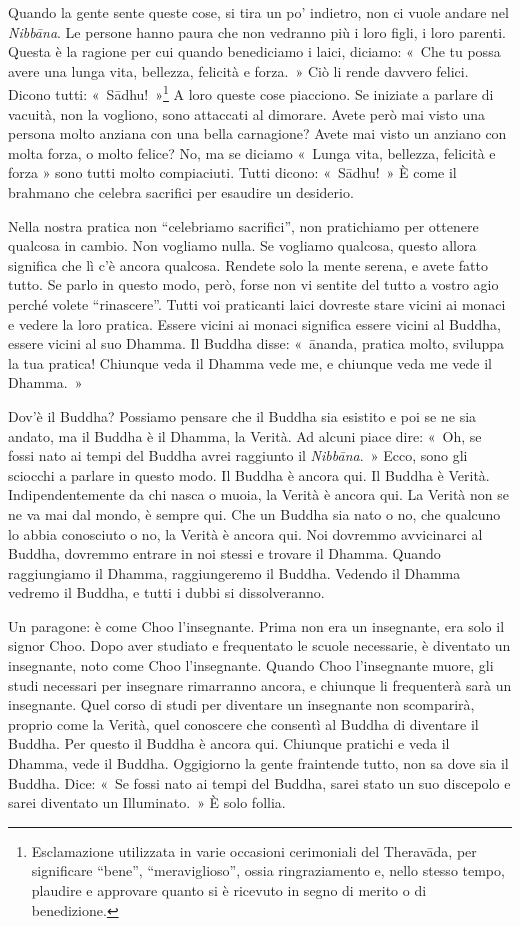 Quando la gente sente queste cose, si tira un po' indietro, non ci vuole
andare nel \emph{Nibbāna}. Le persone hanno paura che non vedranno più i
loro figli, i loro parenti. Questa è la ragione per cui quando
benediciamo i laici, diciamo: «~Che tu possa avere una lunga vita,
bellezza, felicità e forza.~» Ciò li rende davvero felici. Dicono tutti:
«~Sādhu!~»\footnote{Esclamazione utilizzata in varie occasioni
  cerimoniali del Theravāda, per significare ``bene'', ``meraviglioso'',
  ossia ringraziamento e, nello stesso tempo, plaudire e approvare
  quanto si è ricevuto in segno di merito o di benedizione.} A loro
queste cose piacciono. Se iniziate a parlare di vacuità, non la
vogliono, sono attaccati al dimorare. Avete però mai visto una persona
molto anziana con una bella carnagione? Avete mai visto un anziano con
molta forza, o molto felice? No, ma se diciamo «~Lunga vita, bellezza,
felicità e forza » sono tutti molto compiaciuti. Tutti dicono:
«~Sādhu!~» È come il brahmano che celebra sacrifici per esaudire un
desiderio.

Nella nostra pratica non ``celebriamo sacrifici'', non pratichiamo per
ottenere qualcosa in cambio. Non vogliamo nulla. Se vogliamo qualcosa,
questo allora significa che lì c'è ancora qualcosa. Rendete solo la
mente serena, e avete fatto tutto. Se parlo in questo modo, però, forse
non vi sentite del tutto a vostro agio perché volete ``rinascere''.
Tutti voi praticanti laici dovreste stare vicini ai monaci e vedere la
loro pratica. Essere vicini ai monaci significa essere vicini al Buddha,
essere vicini al suo Dhamma. Il Buddha disse: «~ānanda, pratica molto,
sviluppa la tua pratica! Chiunque veda il Dhamma vede me, e chiunque
veda me vede il Dhamma.~»

Dov'è il Buddha? Possiamo pensare che il Buddha sia esistito e poi se ne
sia andato, ma il Buddha è il Dhamma, la Verità. Ad alcuni piace dire:
«~Oh, se fossi nato ai tempi del Buddha avrei raggiunto il
\emph{Nibbāna}.\emph{~}» Ecco, sono gli sciocchi a parlare in questo
modo. Il Buddha è ancora qui. Il Buddha è Verità. Indipendentemente da
chi nasca o muoia, la Verità è ancora qui. La Verità non se ne va mai
dal mondo, è sempre qui. Che un Buddha sia nato o no, che qualcuno lo
abbia conosciuto o no, la Verità è ancora qui. Noi dovremmo avvicinarci
al Buddha, dovremmo entrare in noi stessi e trovare il Dhamma. Quando
raggiungiamo il Dhamma, raggiungeremo il Buddha. Vedendo il Dhamma
vedremo il Buddha, e tutti i dubbi si dissolveranno.

Un paragone: è come Choo l'insegnante. Prima non era un insegnante, era
solo il signor Choo. Dopo aver studiato e frequentato le scuole
necessarie, è diventato un insegnante, noto come Choo l'insegnante.
Quando Choo l'insegnante muore, gli studi necessari per insegnare
rimarranno ancora, e chiunque li frequenterà sarà un insegnante. Quel
corso di studi per diventare un insegnante non scomparirà, proprio come
la Verità, quel conoscere che consentì al Buddha di diventare il Buddha.
Per questo il Buddha è ancora qui. Chiunque pratichi e veda il Dhamma,
vede il Buddha. Oggigiorno la gente fraintende tutto, non sa dove sia il
Buddha. Dice: «~Se fossi nato ai tempi del Buddha, sarei stato un suo
discepolo e sarei diventato un Illuminato.~» È solo follia.

